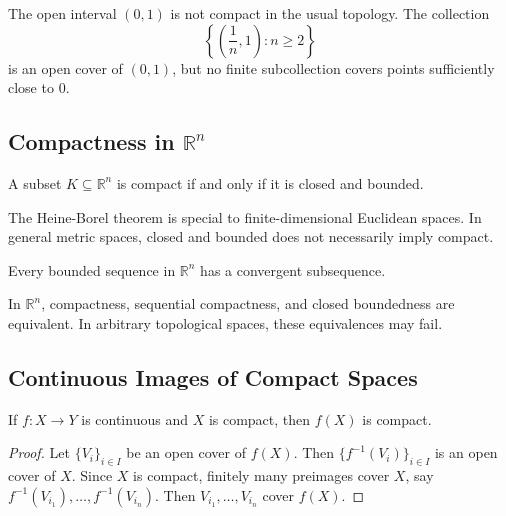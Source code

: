 \begin{example}
The open interval $(0,1)$ is not compact in the usual topology. The collection
\[
    \left\{\left(\frac{1}{n},1\right):n\geq 2\right\}
\]
is an open cover of $(0,1)$, but no finite subcollection covers points sufficiently close to $0$.
\end{example}

\subsection{Compactness in \texorpdfstring{$\mathbb{R}^n$}{R n}}

\begin{theorem}
A subset $K\subseteq\mathbb{R}^n$ is compact if and only if it is closed and bounded.
\end{theorem}

\begin{remark}
The Heine-Borel theorem is special to finite-dimensional Euclidean spaces. In general metric spaces, closed and bounded does not necessarily imply compact.
\end{remark}

\begin{theorem}
Every bounded sequence in $\mathbb{R}^n$ has a convergent subsequence.
\end{theorem}

\begin{remark}
In $\mathbb{R}^n$, compactness, sequential compactness, and closed boundedness are equivalent. In arbitrary topological spaces, these equivalences may fail.
\end{remark}

\subsection{Continuous Images of Compact Spaces}

\begin{theorem}
If $f:X\to Y$ is continuous and $X$ is compact, then $f(X)$ is compact.
\end{theorem}

\begin{proof}
Let $\{V_i\}_{i\in I}$ be an open cover of $f(X)$. Then $\{f^{-1}(V_i)\}_{i\in I}$ is an open cover of $X$. Since $X$ is compact, finitely many preimages cover $X$, say $f^{-1}(V_{i_1}),\dots,f^{-1}(V_{i_n})$. Then $V_{i_1},\dots,V_{i_n}$ cover $f(X)$.
\end{proof}

